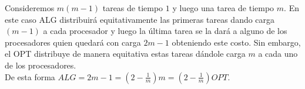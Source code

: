 \documentclass[dcc,uchile]{fcfmcourse}
\theoremstyle{plain}
\theoremstyle{definition}
\begin{document}
\begin{problems}
\begin{enumerate}[a)]
    Consideremos $m(m-1)$ tareas de tiempo $1$ y luego una tarea de tiempo $m$. En este caso ALG distribuirá equitativamente las primeras tareas dando carga $(m-1)$ a cada procesador y luego la última tarea se la dará a alguno de los procesadores quien quedará con carga $2m-1$ obteniendo este costo. Sin embargo, el OPT distribuye de manera equitativa estas tareas dándole carga $m$ a cada uno de los procesadores.\\
    
    De esta forma $ALG = 2m-1 = \left(2-\frac{1}{m}\right)m = \left(2-\frac{1}{m}\right)OPT$.
\end{enumerate}
\end{problems}
\end{document}
